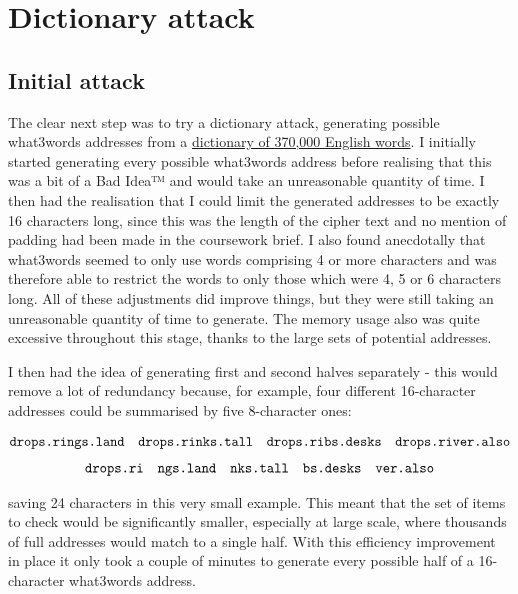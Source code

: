 \documentclass[11pt]{article} %
\newcommand{\textapprox}{\raisebox{0.5ex}{\texttildelow}}
\begin{document}
\section{Dictionary attack}

\subsection{Initial attack}

The clear next step was to try a dictionary attack, generating possible what3words addresses from a \href{https://github.com/dwyl/english-words/blob/master/words_dictionary.json}{dictionary of \textapprox{}370,000 English words}. I initially started generating every possible what3words address before realising that this was a bit of a Bad Idea™ and would take an unreasonable quantity of time. I then had the realisation that I could limit the generated addresses to be exactly 16 characters long, since this was the length of the cipher text and no mention of padding had been made in the coursework brief. I also found anecdotally that what3words seemed to only use words comprising 4 or more characters and was therefore able to restrict the words to only those which were 4, 5 or 6 characters long. All of these adjustments did improve things, but they were still taking an unreasonable quantity of time to generate. The memory usage also was quite excessive throughout this stage, thanks to the large sets of potential addresses.

I then had the idea of generating first and second halves separately - this would remove a lot of redundancy because, for example, four different 16-character addresses could be summarised by five 8-character ones:

\vspace{-0.3cm}

$$
\begin{matrix}
\verb|drops.rings.land| & \verb|drops.rinks.tall| & \verb|drops.ribs.desks| & \verb|drops.river.also|
\end{matrix}
$$
$$
\begin{matrix}
\verb|drops.ri| & \verb|ngs.land| & \verb|nks.tall| & \verb|bs.desks| & \verb|ver.also|
\end{matrix}
$$

saving 24 characters in this very small example. This meant that the set of items to check would be significantly smaller, especially at large scale, where thousands of full addresses would match to a single half. With this efficiency improvement in place it only took a couple of minutes to generate every possible half of a 16-character what3words address.
\end{document}
